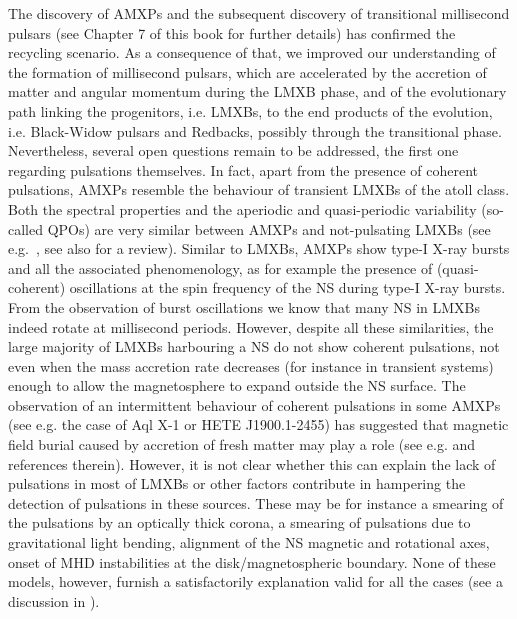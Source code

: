 \documentclass[graybox]{svmult}
\begin{document}
The discovery of AMXPs and the subsequent discovery of transitional millisecond pulsars (see Chapter 7 of this book for further details) has confirmed the recycling scenario. As a consequence of that, we improved our understanding of the formation of millisecond pulsars, which are accelerated by the accretion of matter and angular momentum during the LMXB phase, and of the evolutionary path linking the progenitors, i.e. LMXBs, to the end products of the evolution, i.e. Black-Widow pulsars and Redbacks, possibly through the transitional phase. Nevertheless, several open questions remain to be addressed, the first one regarding pulsations themselves.  
In fact, apart from the presence of coherent pulsations, AMXPs resemble the behaviour of transient LMXBs of the atoll class. Both the spectral properties and the aperiodic and quasi-periodic variability (so-called QPOs) are very similar between AMXPs and not-pulsating LMXBs (see e.g.\ \cite{Wijnands1999}, see also \cite{Patruno2012} for a review). Similar to LMXBs, AMXPs show type-I X-ray bursts and all the associated phenomenology, as for example the presence of (quasi-coherent) oscillations at the spin frequency of the NS during type-I X-ray bursts. From the observation of burst oscillations we know that many NS in LMXBs indeed rotate at millisecond periods. However, despite all these similarities, the large majority of LMXBs harbouring a NS do not show coherent pulsations, not even when the mass accretion rate decreases (for instance in transient systems) enough to allow the magnetosphere to expand outside the NS surface. The observation of an intermittent behaviour of coherent pulsations in some AMXPs (see e.g. the case of Aql X-1 or HETE J1900.1-2455) has suggested that magnetic field burial caused by accretion of fresh matter may play a role (see e.g. \cite{Cumming2001} and references therein). However, it is not clear whether this can explain the lack of pulsations in most of LMXBs or other factors contribute in hampering the detection of pulsations in these sources. These may be for instance a smearing of the pulsations by an optically thick corona, a smearing of pulsations due to gravitational light bending, alignment of the NS magnetic and rotational axes, onset of MHD instabilities at the disk/magnetospheric boundary. None of these models, however, furnish a satisfactorily explanation valid for all the cases (see a discussion in \cite{Patruno2012,Campana2018}).
\end{document}
